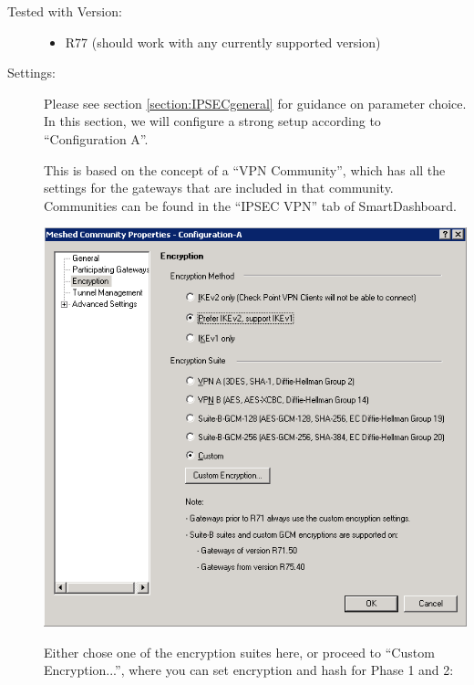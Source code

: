\begin{description}
\item[Tested with Version:] \mbox{}

\begin{itemize}
\item R77 (should work with any currently supported version)
\end{itemize}

\item[Settings:] \mbox{}

Please see section \ref{section:IPSECgeneral} for guidance on
parameter choice. In this section, we will configure a strong setup
according to ``Configuration A''.

This is based on the concept of a ``VPN Community'', which has all the
settings for the gateways that are included in that community.
Communities can be found in the ``IPSEC VPN'' tab of SmartDashboard.


\includegraphics{checkpoint_1.png}

Either chose one of the encryption suites here, or proceed to
``Custom Encryption...'', where you can set encryption and hash for
Phase 1 and 2:


\end{description}
